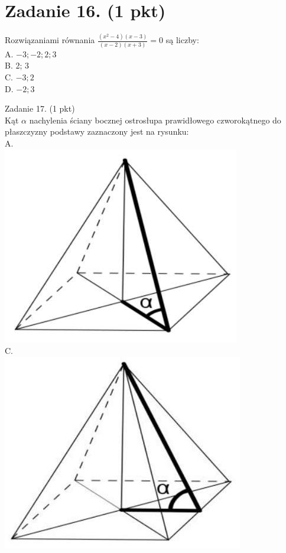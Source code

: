 \documentclass[10pt]{article}
\begin{document}
\section*{Zadanie 16. (1 pkt)}
Rozwiązaniami równania \(\frac{\left(x^{2}-4\right)(x-3)}{(x-2)(x+3)}=0\) są liczby:\\
A. \(-3 ;-2 ; 2 ; 3\)\\
B. 2; 3\\
C. \(-3 ; 2\)\\
D. \(-2 ; 3\)

Zadanie 17. (1 pkt)\\
Kąt \(\alpha\) nachylenia ściany bocznej ostrosłupa prawidłowego czworokątnego do płaszczyzny podstawy zaznaczony jest na rysunku:\\
A.\\
\includegraphics[max width=\textwidth, center]{2024_11_21_9a9f600c3b3af5013d80g-06(7)}\\
C.\\
\includegraphics[max width=\textwidth, center]{2024_11_21_9a9f600c3b3af5013d80g-06(4)}\\
\end{document}
